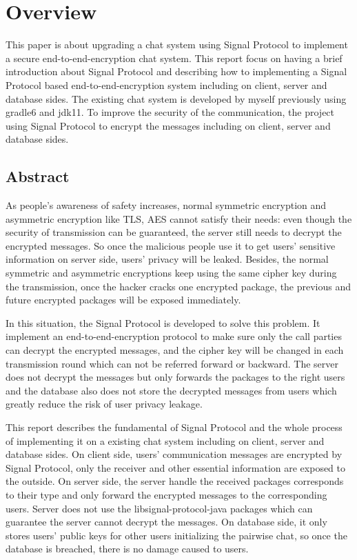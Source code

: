 \section{Overview}
This paper is about upgrading a chat system using Signal Protocol to implement a secure end-to-end-encryption chat system. This report focus on having a brief introduction about Signal Protocol and describing how to implementing a Signal Protocol based end-to-end-encryption system including on client, server and database sides.
The existing chat system is developed by myself previously using gradle6 and jdk11. To improve the security of the communication, the project using Signal Protocol to encrypt the messages including on client, server and database sides.

\subsection{Abstract}
As people’s awareness of safety increases, normal symmetric encryption and asymmetric encryption like TLS, AES cannot satisfy their needs: even though the security of transmission can be guaranteed, the server still needs to decrypt the encrypted messages. So once the malicious people use it to get users' sensitive information on server side, users' privacy will be leaked. Besides, the normal symmetric and asymmetric encryptions keep  using the same cipher key during the transmission, once the hacker cracks one encrypted package, the previous and future encrypted packages will be exposed immediately.

In this situation, the Signal Protocol is developed to solve this problem. It implement an end-to-end-encryption protocol to make sure only the call parties can decrypt the encrypted messages, and the cipher key will be changed in each transmission round which can not be referred forward or backward. The server does not decrypt the messages but only forwards the packages to the right users and the database also does not store the decrypted messages from users which greatly reduce the risk of user privacy leakage.

This report describes the fundamental of Signal Protocol and the whole process of implementing it on a existing chat system including on client, server and database sides. On client side, users' communication messages are encrypted by Signal Protocol, only the receiver and other essential information are exposed to the outside. On server side, the server handle the received packages corresponds to their type and only forward the encrypted messages to the corresponding users. Server does not use the libsignal-protocol-java packages which can guarantee the server cannot decrypt the messages. On database side, it only stores users' public keys for other users initializing the pairwise chat, so once the database is breached, there is no damage caused to users.

